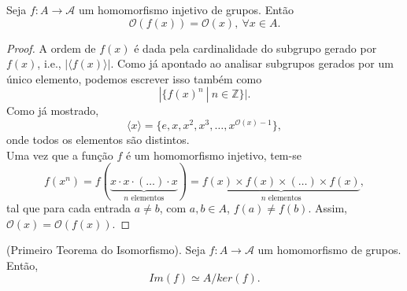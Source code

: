 \documentclass[11pt,openany]{book}
\newcommand{\gen}[1]{\ensuremath{\langle #1\rangle}}
\begin{document}
\begin{proposition}
\label{prop:ordem_f_x_igual_ordem_x}
    Seja $f:A\rightarrow\mathcal{A}$ um homomorfismo injetivo de grupos. Então
    \[\mathcal{O}(f(x)) = \mathcal{O}(x), \ \forall x \in A.\]
\end{proposition}

\begin{proof}
    A ordem de $f(x)$ é dada pela cardinalidade do subgrupo gerado por $f(x)$, i.e., $|\gen{f(x)}|$. Como já apontado ao analisar subgrupos gerados por um único elemento, podemos escrever isso também como
    \[|\{f(x)^n \ | \ n \in \mathbb{Z}\}|.\]
    Como já mostrado,
    \[\gen{x} = \{e, x, x^2, x^3, \dots, x^{\mathcal{O}(x)-1}\},\]
    onde todos os elementos são distintos.\\
    Uma vez que a função $f$ é um homomorfismo injetivo, tem-se
    \[f(x^n) = f(\underbrace{x\cdot x \cdot (\dots) \cdot x}_{\text{$n$ elementos}}) = \underbrace{f(x) \times f(x) \times (\dots) \times f(x)}_{\text{$n$ elementos}},\]
    tal que para cada entrada $a \not= b$, com $a, b \in A$, $f(a) \not= f(b)$. Assim, $\mathcal{O}(x) = \mathcal{O}(f(x))$.
\end{proof}

 \begin{theorem}
 \label{theo:primeiro_teorema_isomorfismo}
    (Primeiro Teorema do Isomorfismo). Seja $f:A \rightarrow \mathcal{A}$ um homomorfismo de grupos. Então, \[Im(f) \simeq A/ker(f).\]
 \end{theorem}
 
\end{document}
